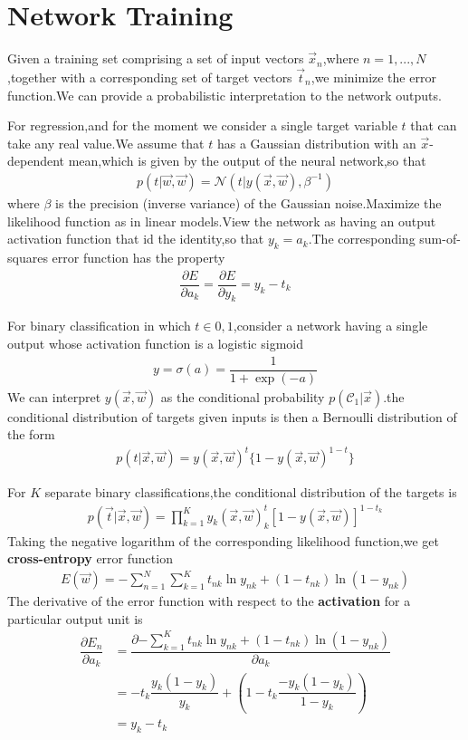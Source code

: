\section{Network Training}
Given a training set comprising a set of input vectors ${\vec{x}_n}$,where $n=1,...,N$,together with a corresponding set of target vectors ${\vec{t}_n}$,we minimize the error function.We can provide a probabilistic interpretation to the network outputs.

For regression,and for the moment we consider a single target variable $t$ that can take any real value.We assume that $t$ has a Gaussian distribution with an $\vec{x}$-dependent mean,which is given by the output of the neural network,so that
\begin{align}
    p(t|\vec{w},\vec{w})=\mathcal{N}(t|y(\vec{x},\vec{w}),\beta^{-1})
\end{align}
where $\beta$ is the precision (inverse variance) of the Gaussian noise.Maximize the likelihood function as in linear models.View the network as having an output activation function that id the identity,so that $y_k=a_k$.The corresponding sum-of-squares error function has the property
\begin{align}\label{eqn:output activation function derivative}
    \dfrac{\partial E}{\partial a_k}=\dfrac{\partial E}{\partial y_k}=y_k - t_k
\end{align}

For binary classification in which $t\in{0,1}$,consider a network having a single output whose activation function is a logistic sigmoid
\begin{align}
    y=\sigma(a)=\dfrac{1}{1+\exp(-a)}
\end{align}
We can interpret $y(\vec{x},\vec{w})$ as the conditional probability $p(\mathcal{C}_1|\vec{x})$.the conditional distribution of targets given inputs is then a Bernoulli distribution of the form
\begin{align}
    p(t|\vec{x},\vec{w})=y(\vec{x},\vec{w})^t\{{1-y(\vec{x},\vec{w})}^{1-t}\}
\end{align}

For $K$ separate binary classifications,the conditional distribution of the targets is
\begin{align}
    p(\vec{t}|\vec{x},\vec{w})=\prod_{k=1}^{K}y_k(\vec{x},\vec{w})^t_k[1-y(\vec{x},\vec{w})]^{1-t_k}
\end{align}
Taking the negative logarithm of the corresponding likelihood function,we get \textbf{cross-entropy} error function
\begin{align}
    E(\vec{w})=-\sum_{n=1}^{N}\sum_{k=1}^{K}{t_{nk}\ln y_{nk}+(1-t_{nk})\ln(1-y_{nk})}
\end{align}
The derivative of the error function with respect to the \textbf{activation} for a particular output unit is
\begin{align}
    \dfrac{\partial E_n}{\partial a_k}
    &=\dfrac{\partial {-\sum_{k=1}^{K}{t_{nk}\ln y_{nk}+(1-t_{nk})\ln(1-y_{nk})} }}{\partial a_k} \\
    &=-{t_{k} \dfrac{y_{k}(1-y_{k})}{y_{k}} +(1-t_{k}\dfrac{-y_{k}(1-y_{k})}{1-y_{k}}) } \\
    &={y_{k}-t_{k}}
\end{align}

